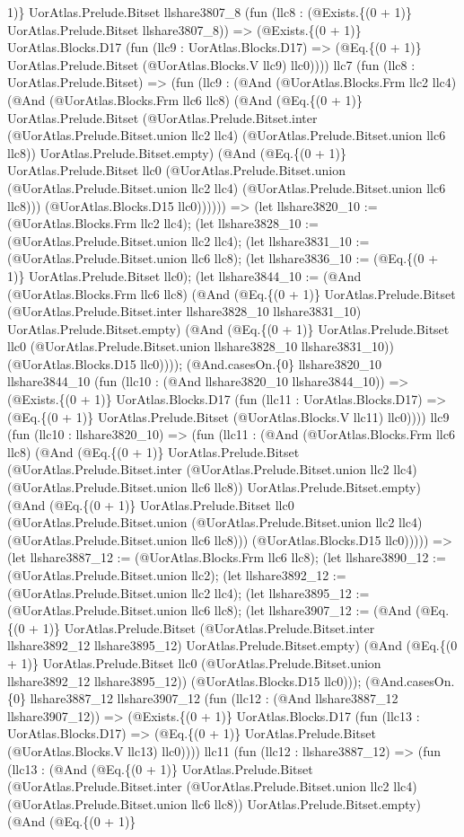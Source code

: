 \documentclass[11pt]{article}
\begin{document}
1)\} UorAtlas.Prelude.Bitset llshare3807\_8 (fun (llc8 : (@Exists.\{(0 + 1)\} UorAtlas.Prelude.Bitset llshare3807\_8)) => (@Exists.\{(0 + 1)\} UorAtlas.Blocks.D17 (fun (llc9 : UorAtlas.Blocks.D17) => (@Eq.\{(0 + 1)\} UorAtlas.Prelude.Bitset (@UorAtlas.Blocks.V llc9) llc0)))) llc7 (fun (llc8 : UorAtlas.Prelude.Bitset) => (fun (llc9 : (@And (@UorAtlas.Blocks.Frm llc2 llc4) (@And (@UorAtlas.Blocks.Frm llc6 llc8) (@And (@Eq.\{(0 + 1)\} UorAtlas.Prelude.Bitset (@UorAtlas.Prelude.Bitset.inter (@UorAtlas.Prelude.Bitset.union llc2 llc4) (@UorAtlas.Prelude.Bitset.union llc6 llc8)) UorAtlas.Prelude.Bitset.empty) (@And (@Eq.\{(0 + 1)\} UorAtlas.Prelude.Bitset llc0 (@UorAtlas.Prelude.Bitset.union (@UorAtlas.Prelude.Bitset.union llc2 llc4) (@UorAtlas.Prelude.Bitset.union llc6 llc8))) (@UorAtlas.Blocks.D15 llc0)))))) => (let llshare3820\_10 := (@UorAtlas.Blocks.Frm llc2 llc4); (let llshare3828\_10 := (@UorAtlas.Prelude.Bitset.union llc2 llc4); (let llshare3831\_10 := (@UorAtlas.Prelude.Bitset.union llc6 llc8); (let llshare3836\_10 := (@Eq.\{(0 + 1)\} UorAtlas.Prelude.Bitset llc0); (let llshare3844\_10 := (@And (@UorAtlas.Blocks.Frm llc6 llc8) (@And (@Eq.\{(0 + 1)\} UorAtlas.Prelude.Bitset (@UorAtlas.Prelude.Bitset.inter llshare3828\_10 llshare3831\_10) UorAtlas.Prelude.Bitset.empty) (@And (@Eq.\{(0 + 1)\} UorAtlas.Prelude.Bitset llc0 (@UorAtlas.Prelude.Bitset.union llshare3828\_10 llshare3831\_10)) (@UorAtlas.Blocks.D15 llc0)))); (@And.casesOn.\{0\} llshare3820\_10 llshare3844\_10 (fun (llc10 : (@And llshare3820\_10 llshare3844\_10)) => (@Exists.\{(0 + 1)\} UorAtlas.Blocks.D17 (fun (llc11 : UorAtlas.Blocks.D17) => (@Eq.\{(0 + 1)\} UorAtlas.Prelude.Bitset (@UorAtlas.Blocks.V llc11) llc0)))) llc9 (fun (llc10 : llshare3820\_10) => (fun (llc11 : (@And (@UorAtlas.Blocks.Frm llc6 llc8) (@And (@Eq.\{(0 + 1)\} UorAtlas.Prelude.Bitset (@UorAtlas.Prelude.Bitset.inter (@UorAtlas.Prelude.Bitset.union llc2 llc4) (@UorAtlas.Prelude.Bitset.union llc6 llc8)) UorAtlas.Prelude.Bitset.empty) (@And (@Eq.\{(0 + 1)\} UorAtlas.Prelude.Bitset llc0 (@UorAtlas.Prelude.Bitset.union (@UorAtlas.Prelude.Bitset.union llc2 llc4) (@UorAtlas.Prelude.Bitset.union llc6 llc8))) (@UorAtlas.Blocks.D15 llc0))))) => (let llshare3887\_12 := (@UorAtlas.Blocks.Frm llc6 llc8); (let llshare3890\_12 := (@UorAtlas.Prelude.Bitset.union llc2); (let llshare3892\_12 := (@UorAtlas.Prelude.Bitset.union llc2 llc4); (let llshare3895\_12 := (@UorAtlas.Prelude.Bitset.union llc6 llc8); (let llshare3907\_12 := (@And (@Eq.\{(0 + 1)\} UorAtlas.Prelude.Bitset (@UorAtlas.Prelude.Bitset.inter llshare3892\_12 llshare3895\_12) UorAtlas.Prelude.Bitset.empty) (@And (@Eq.\{(0 + 1)\} UorAtlas.Prelude.Bitset llc0 (@UorAtlas.Prelude.Bitset.union llshare3892\_12 llshare3895\_12)) (@UorAtlas.Blocks.D15 llc0))); (@And.casesOn.\{0\} llshare3887\_12 llshare3907\_12 (fun (llc12 : (@And llshare3887\_12 llshare3907\_12)) => (@Exists.\{(0 + 1)\} UorAtlas.Blocks.D17 (fun (llc13 : UorAtlas.Blocks.D17) => (@Eq.\{(0 + 1)\} UorAtlas.Prelude.Bitset (@UorAtlas.Blocks.V llc13) llc0)))) llc11 (fun (llc12 : llshare3887\_12) => (fun (llc13 : (@And (@Eq.\{(0 + 1)\} UorAtlas.Prelude.Bitset (@UorAtlas.Prelude.Bitset.inter (@UorAtlas.Prelude.Bitset.union llc2 llc4) (@UorAtlas.Prelude.Bitset.union llc6 llc8)) UorAtlas.Prelude.Bitset.empty) (@And (@Eq.\{(0 + 1)\} 
\end{document}
